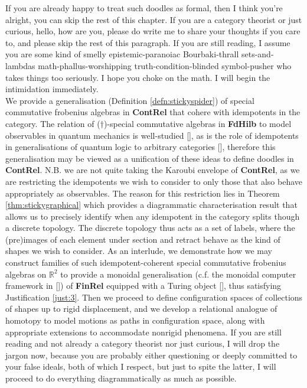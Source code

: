 If you are already happy to treat such doodles as formal, then I think you're alright, you can skip the rest of this chapter. If you are a category theorist or just curious, hello, how are you, please do write me to share your thoughts if you care to, and please skip the rest of this paragraph. If you are still reading, I assume you are some kind of smelly epistemic-paranoiac Bourbaki-thrall sets-and-lambdas math-phallus-worshipping truth-condition-blinded symbol-pusher who takes things too seriously. I hope you choke on the math. I will begin the intimidation immediately.\\

We provide a generalisation (Definition \ref{defn:stickyspider}) of special commutative frobenius algebras in \textbf{ContRel} that cohere with idempotents in the category. The relation of ($\dagger$)-special commutative algebras in \textbf{FdHilb} to model observables in quantum mechanics is well-studied [], as is the role of idempotents in generalisations of quantum logic to arbitrary categories [], therefore this generalisation may be viewed as a unification of these ideas to define doodles in \textbf{ContRel}. N.B. we are not quite taking the Karoubi envelope of \textbf{ContRel}, as we are restricting the idempotents we wish to consider to only those that also behave appropriately as observables. The reason for this restriction lies in Theorem \ref{thm:stickygraphical} which provides a diagrammatic characterisation result that allows us to precisely identify when any idempotent in the category splits though a discrete topology. The discrete topology thus acts as a set of labels, where the (pre)images of each element under section and retract behave as the kind of shapes we wish to consider. As an interlude, we demonstrate how we may construct families of such idempotent-coherent special commutative frobenius algebras on $\mathbb{R}^2$ to provide a monoidal generalisation (c.f. the monoidal computer framework in []) of \textbf{FinRel} equipped with a Turing object [], thus satisfying Justification \ref{just:3}. Then we proceed to define configuration spaces of collections of shapes up to rigid displacement, and we develop a relational analogue of homotopy to model motions as paths in configuration space, along with appropriate extensions to accommodate nonrigid phenomena. If you are still reading and not already a category theorist nor just curious, I will drop the jargon now, because you are probably either questioning or deeply committed to your false ideals, both of which I respect, but just to spite the latter, I will proceed to do everything diagrammatically as much as possible.

